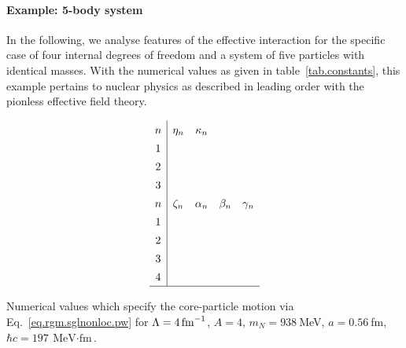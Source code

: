 \documentclass
[aps,nofootinbib,prl,showpacs,twocolumn,groupedaddress,superscriptaddress]
{revtex4}
\newcommand{\la}{\label}
\newcommand{\be}{\begin{equation}}
\newcommand{\ee}{\end{equation}}
\newcommand{\lam}[1]{\mbox{\ensuremath{\Lambda=#1\,\text{fm}^{-1}}}}
\begin{document}
\paragraph{Example: 5-body system}
In the following, we analyse features of the effective interaction for the
specific case of four internal degrees of freedom and a system of five particles
with identical masses. With the numerical values as given in table~\ref{tab.constants},
this example pertains to nuclear physics as described in leading order with the
pionless effective field theory.

\begin{table}
\be\la{tab.constants}
\setlength{\tabcolsep}{4pt}
\renewcommand{\arraystretch}{1.4}
\begin{array}{c|cccc}
n & \eta_n & \kappa_n & & \\
1 & & & & \\
2 & & & & \\
3 & & & & \\
n & \zeta_n & \alpha_n & \beta_n & \gamma_n \\
1 & & & & \\
2 & & & & \\
3 & & & & \\
4 & & & & \\
\hline
\end{array}
\ee
\caption{Numerical values which specify the core-particle motion via
Eq.~\eqref{eq.rgm.sglnonloc.pw} for $\lam{4}$, $A=4$, $m_N=938~$MeV, $a=0.56~$fm, $\hbar c=197~\text{MeV$\cdot$fm}$.}
\end{table}

\newpage
\end{document}
